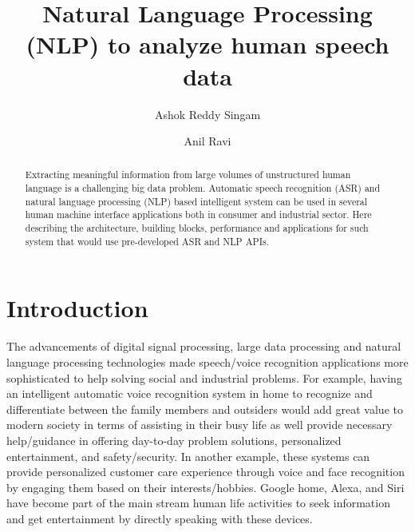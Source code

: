 \documentclass[sigconf]{acmart}
\begin{document}
\title{Natural Language Processing (NLP) to analyze human speech data}

\author{Ashok Reddy Singam}

\author{Anil Ravi}

\begin{abstract}
Extracting meaningful information from large volumes of unstructured human language is a challenging big data problem. Automatic speech recognition (ASR) and natural language processing (NLP) based intelligent system can be  used in several human machine interface applications both in consumer and industrial sector. Here describing the architecture, building blocks, performance and applications for such system that would use pre-developed ASR and NLP APIs.
\end{abstract}



\maketitle


\section{Introduction}
The advancements of digital signal processing, large data processing and natural language processing technologies made speech/voice recognition applications more sophisticated to help solving social and industrial problems. For example, having an intelligent automatic voice recognition system in home to recognize and differentiate between the family members and outsiders would add great value to modern society in terms of assisting in their busy life as well provide necessary help/guidance in offering day-to-day problem solutions, personalized entertainment,  and safety/security. In another example, these systems can provide personalized customer care experience through voice and face recognition by engaging them based on their interests/hobbies. Google home, Alexa, and Siri have become part of the main stream human life activities to seek information and get entertainment by directly speaking with these devices.
\end{document}
